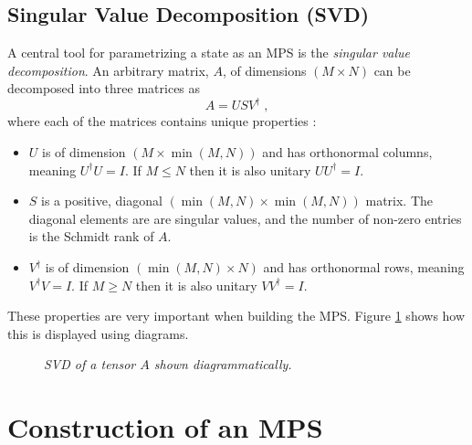 \subsection{Singular Value Decomposition (SVD)}
A central tool for parametrizing a state as an MPS is the \textit{singular value decomposition}. An arbitrary matrix, $A$, of dimensions $(M \times N)$ can be decomposed into three matrices as
\begin{equation}
	A = U S V^{\dag} \; ,
\end{equation}
where each of the matrices contains unique properties \cite{Schollwock}:
\begin{itemize}
	\item
		$U$ is of dimension $(M \times \min(M,N))$ and has orthonormal columns, meaning 			$U^{\dag}U = I$. If $M \leq N$ then it is also unitary $U U^{\dag} = I$.
	\item
		$S$ is a positive, diagonal $(\min(M,N) \times \min(M,N))$ matrix. The diagonal 			elements are are singular values, and the number of non-zero entries is the 				Schmidt rank of $A$.
	\item
		 $V^{\dag}$ is of dimension $(\min(M,N) \times N)$ and has orthonormal rows, meaning $V^{\dag}V = I$. If $M \geq N$ then it is also unitary $V V^{\dag} = I$.
\end{itemize}
These properties are very important when building the MPS. Figure \ref{fig:SVD} shows how this is displayed using diagrams.

\begin{figure}[h!]
	\centering
	
	\caption{\textit{SVD of a tensor $A$ shown diagrammatically.}}
	\label{fig:SVD}
\end{figure}


\section{Construction of an MPS} \label{sec:construct_MPS}

